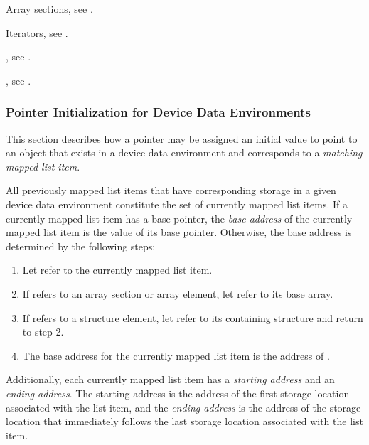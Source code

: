 \begin{crossrefs}
\item Array sections, see .

\item Iterators, see .

\item {}, see
.

\item {}, see
.
\end{crossrefs}

\begin{ccppspecific}
\subsubsection{Pointer Initialization for Device Data Environments}
\label{subsec:pointer initialization}

This section describes how a pointer may be assigned an initial value to point
to an object that exists in a device data environment and corresponds to a
\emph{matching mapped list item}.

All previously mapped list items that have corresponding storage in a given
device data environment constitute the set of currently mapped list items.  If
a currently mapped list item has a base pointer, the \emph{base address} of
the currently mapped list item is the value of its base pointer. Otherwise,
the base address is determined by the following steps:

\begin{enumerate}
\item Let  refer to the currently mapped list item.

\item If  refers to an array section or array element, let 
    refer to its base array.

\item If  refers to a structure element, let  refer to its
    containing structure and return to step 2.

\item The base address for the currently mapped list item is the address of .
\end{enumerate}

Additionally, each currently mapped list item has a \emph{starting address}
and an \emph{ending address}. The starting address is the address of the
first storage location associated with the list item, and the \emph{ending
address} is the address of the storage location that immediately follows
the last storage location associated with the list item.


\end{ccppspecific}
